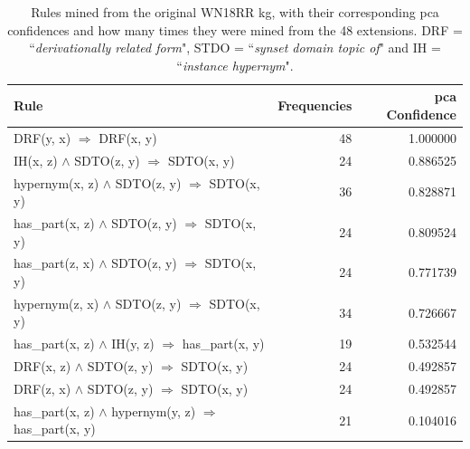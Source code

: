 \label{Rule_comparison}
\begin{table}[htbp]
\begin{tabular}{lrr}
\toprule
                                                                                                      Rule &  Frequencies &  \gls{pca} Confidence \\
\midrule
                            DRF(y, x)   $\Rightarrow$ DRF(x, y) &           48 &        1.000000 \\
          IH(x, z) $\wedge$ SDTO(z, y)   $\Rightarrow$ SDTO(x, y) &           24 &        0.886525 \\
                   hypernym(x, z) $\wedge$ SDTO(z, y)   $\Rightarrow$ SDTO(x, y) &           36 &        0.828871 \\
                   has\_part(x, z) $\wedge$ SDTO(z, y)   $\Rightarrow$ SDTO(x, y) &           24 &        0.809524 \\
                   has\_part(z, x) $\wedge$ SDTO(z, y)   $\Rightarrow$ SDTO(x, y) &           24 &        0.771739 \\
                   hypernym(z, x) $\wedge$ SDTO(z, y)   $\Rightarrow$ SDTO(x, y) &           34 &        0.726667 \\
                                      has\_part(x, z) $\wedge$ IH(y, z)   $\Rightarrow$ has\_part(x, y) &           19 &        0.532544 \\
DRF(x, z) $\wedge$ SDTO(z, y)   $\Rightarrow$ SDTO(x, y) &           24 &        0.492857 \\
DRF(z, x) $\wedge$ SDTO(z, y)   $\Rightarrow$ SDTO(x, y) &           24 &        0.492857 \\
                                               has\_part(x, z) $\wedge$ hypernym(y, z)   $\Rightarrow$ has\_part(x, y) &           21 &        0.104016 \\
\bottomrule
\end{tabular}
\caption[Rules mined from the original WN18RR KG]{Rules mined from the original WN18RR \gls{kg}, with their corresponding \gls{pca} confidences and how many times they were mined from the 48 extensions. DRF = ``\textit{derivationally related form}", STDO = ``\textit{synset domain topic of}" and IH = ``\textit{instance hypernym}".}
\label{wn18rr_original_rules_table_PCA}
\end{table}



